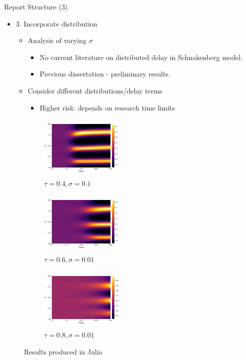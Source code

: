 \documentclass{beamer}
\begin{document}
\begin{frame}{Report Structure (3)}
    \begin{itemize}
        \item 3. Incorporate distribution
        \begin{itemize}
            \item Analysis of varying $\sigma$
            \begin{itemize}
                \item No current literature on distributed delay in Schnakenberg model.
                \item Previous dissertation - preliminary results.
            \end{itemize}
            \item Consider different distributions/delay terms
            \begin{itemize}
                \item Higher risk: depends on research time limits
            \end{itemize}
        \end{itemize}
    \end{itemize}

    \begin{figure}[H]
        \begin{subfigure}[b]{0.32\linewidth}
            \centering
            \includegraphics[width=4cm,height=3cm]{pic1.png}
            \caption{$\tau=0.4, \sigma=0.1$}
        \end{subfigure}
        \begin{subfigure}[b]{0.32\linewidth}
            \centering
            \includegraphics[width=4cm,height=3cm]{pic2.png}
            \caption{$\tau=0.6, \sigma=0.01$}
        \end{subfigure}
        \begin{subfigure}[b]{0.32\linewidth}
            \centering
            \includegraphics[width=4cm,height=3cm]{pic3.png}
            \caption{$\tau=0.8, \sigma=0.01$}
        \end{subfigure}
        \caption{Results produced in Julia}
    \end{figure}

\end{frame}
\end{document}
